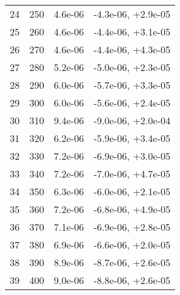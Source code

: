 \begin{table}
\begin{adjustbox}{width=1\textwidth/2}
\begin{tabular}{|c|c|c|c|}
\cline{1-4}
24 & 250 & 4.6e-06 & -4.3e-06, +2.9e-05 \\
\cline{1-4}
25 & 260 & 4.6e-06 & -4.4e-06, +3.1e-05 \\
\cline{1-4}
26 & 270 & 4.6e-06 & -4.4e-06, +4.3e-05 \\
\cline{1-4}
27 & 280 & 5.2e-06 & -5.0e-06, +2.3e-05 \\
\cline{1-4}
28 & 290 & 6.0e-06 & -5.7e-06, +3.3e-05 \\
\cline{1-4}
29 & 300 & 6.0e-06 & -5.6e-06, +2.4e-05 \\
\cline{1-4}
30 & 310 & 9.4e-06 & -9.0e-06, +2.0e-04 \\
\cline{1-4}
31 & 320 & 6.2e-06 & -5.9e-06, +3.4e-05 \\
\cline{1-4}
32 & 330 & 7.2e-06 & -6.9e-06, +3.0e-05 \\
\cline{1-4}
33 & 340 & 7.2e-06 & -7.0e-06, +4.7e-05 \\
\cline{1-4}
34 & 350 & 6.3e-06 & -6.0e-06, +2.1e-05 \\
\cline{1-4}
35 & 360 & 7.2e-06 & -6.8e-06, +4.9e-05 \\
\cline{1-4}
36 & 370 & 7.1e-06 & -6.9e-06, +2.8e-05 \\
\cline{1-4}
37 & 380 & 6.9e-06 & -6.6e-06, +2.0e-05 \\
\cline{1-4}
38 & 390 & 8.9e-06 & -8.7e-06, +2.6e-05 \\
\cline{1-4}
39 & 400 & 9.0e-06 & -8.8e-06, +2.6e-05 \\
\cline{1-4}
\end{tabular}
\end{adjustbox}
\end{table}

